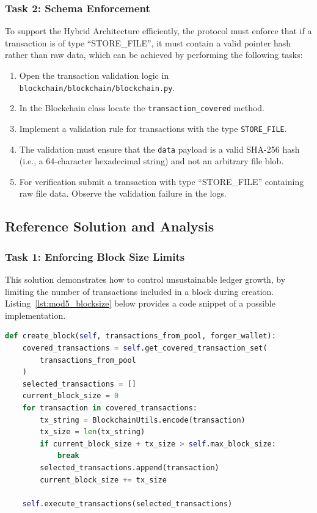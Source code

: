 \subsubsection*{Task 2: Schema Enforcement}
To support the Hybrid Architecture efficiently, the protocol must enforce that if a transaction is of type \enquote{STORE\_FILE}, it must contain a valid pointer hash rather than raw data, which can be achieved by performing the following tasks:

\begin{enumerate}
    \item Open the transaction validation logic in \texttt{blockchain/blockchain/blockchain.py}.
    \item In the Blockchain class locate the \texttt{transaction\_covered} method.
    \item Implement a validation rule for transactions with the type \texttt{STORE\_FILE}.
    \item The validation must ensure that the \texttt{data} payload is a valid SHA-256 hash (i.e., a 64-character hexadecimal string) and not an arbitrary file blob.
    \item For verification submit a transaction with type \enquote{STORE\_FILE} containing raw file data. Observe the validation failure in the logs.
\end{enumerate}

\newpage
\subsection{Reference Solution and Analysis}

\subsubsection*{Task 1: Enforcing Block Size Limits} 
This solution demonstrates how to control unsustainable ledger growth, by limiting the number of transactions included in a block during creation. Listing~\ref{lst:mod5_blocksize} below provides a code snippet of a possible implementation.

\begin{lstlisting}[language=Python, caption=Block Size Enforcement, label=lst:mod5_blocksize]
def create_block(self, transactions_from_pool, forger_wallet):
    covered_transactions = self.get_covered_transaction_set(
        transactions_from_pool
    )
    selected_transactions = []
    current_block_size = 0
    for transaction in covered_transactions:
        tx_string = BlockchainUtils.encode(transaction)
        tx_size = len(tx_string)
        if current_block_size + tx_size > self.max_block_size:
            break
        selected_transactions.append(transaction)
        current_block_size += tx_size

    self.execute_transactions(selected_transactions)
        
\end{lstlisting}
